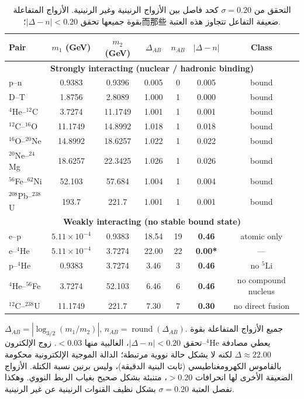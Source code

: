 \documentclass[12pt,a4paper]{article}
\begin{document}
	\begin{otherlanguage}{english}
		\begin{table}[H]
			\centering
			\caption{التحقق من \(\sigma = 0.20\) كحد فاصل بين الأزواج الرنينية وغير الرنينية. الأزواج المتفاعلة بقوة جميعها تحقق \(|\Delta-n| < 0.20\)؛而那些 ضعيفة التفاعل تتجاوز هذه العتبة.}
			\label{tab:sigma_validation_heavy}
			\small
			\begin{tabular}{l c c c c c c}
				\toprule
				Pair & \(m_1\) (GeV) & \(m_2\) (GeV) & \(\Delta_{AB}\) & \(n_{AB}\) & \(|\Delta-n|\) & Class \\
				\midrule
				\multicolumn{7}{c}{\textbf{Strongly interacting (nuclear / hadronic binding)}} \\
				p--n           & 0.9383 & 0.9396 & 0.005  & 0 & 0.005 & bound \\
				D--T           & 1.8756 & 2.8089 & 1.000  & 1 & 0.000 & bound \\
				\(^4\)He--\(^{12}\)C  & 3.7274 & 11.1749& 1.001  & 1 & 0.001 & bound \\
				\(^{12}\)C--\(^{16}\)O & 11.1749& 14.8992& 1.018  & 1 & 0.018 & bound \\
				\(^{16}\)O--\(^{20}\)Ne& 14.8992& 18.6257& 1.022  & 1 & 0.022 & bound \\
				\(^{20}\)Ne--\(^{24}\)Mg& 18.6257& 22.3425& 1.026  & 1 & 0.026 & bound \\
				\(^{56}\)Fe--\(^{62}\)Ni& 52.103 & 57.684 & 1.004  & 1 & 0.004 & bound \\
				\(^{208}\)Pb--\(^{238}\)U& 193.7  & 221.7  & 1.001  & 1 & 0.001 & bound \\
				\midrule
				\multicolumn{7}{c}{\textbf{Weakly interacting (no stable bound state)}} \\
				e--p           & \(5.11\times10^{-4}\) & 0.9383 & 18.54  & 19 & \textbf{0.46} & atomic only \\
				e--\(^4\)He      & \(5.11\times10^{-4}\) & 3.7274 & 22.00  & 22 & \textbf{0.00*} & — \\
				p--\(^4\)He      & 0.9383 & 3.7274 & 3.46   & 3  & \textbf{0.46} & no \(^5\)Li \\
				\(^4\)He--\(^{56}\)Fe & 3.7274 & 52.103 & 6.46   & 6  & \textbf{0.46} & no compound nucleus \\
				\(^{12}\)C--\(^{238}\)U& 11.1749& 221.7  & 7.30   & 7  & \textbf{0.30} & no direct fusion \\
				\bottomrule
			\end{tabular}
			\par\smallskip
			\footnotesize
			\(\Delta_{AB} = |\log_{3/2}(m_1/m_2)|\), \(n_{AB} = \operatorname{round}(\Delta_{AB})\). جميع الأزواج المتفاعلة بقوة تحقق \(|\Delta-n| < 0.20\)، الغالبية منها \(<0.03\). زوج الإلكترون--\(^4\)He يعطي مصادفة \(\Delta\approx22.00\) لكنه لا يشكل حالة نووية مرتبطة؛ الدالة الموجية الإلكترونية محكومة بالقاموس الكهرومغناطيسي (ثابت البنية الدقيقة)، وليس برنين نسبة الكتلة. الأزواج الضعيفة الأخرى لها انحرافات \(>0.20\)، متنبئة بشكل صحيح بغياب الربط النووي. وهكذا تفصل العتبة \(\sigma = 0.20\) بشكل نظيف القنوات الرنينية عن غير الرنينية.
		\end{table}
	\end{otherlanguage}
	
\end{document}
